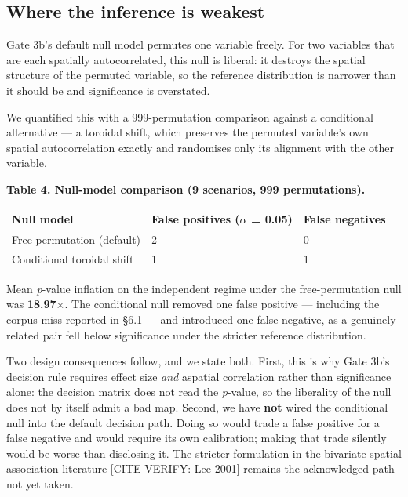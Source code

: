 \subsection{Where the inference is weakest}
Gate 3b's default null model permutes one variable freely. For two variables that are each spatially autocorrelated, this null is liberal: it destroys the spatial structure of the permuted variable, so the reference distribution is narrower than it should be and significance is overstated.

We quantified this with a 999-permutation comparison against a conditional alternative --- a toroidal shift, which preserves the permuted variable's own spatial autocorrelation exactly and randomises only its alignment with the other variable.

\textbf{Table 4. Null-model comparison (9 scenarios, 999 permutations).}

\begin{table}[htbp]
\centering
\small
\begin{tabular}{p{}p{}p{}}
\toprule
Null model & False positives ($\alpha$ = 0.05) & False negatives \\
\midrule
Free permutation (default) & 2 & 0 \\
Conditional toroidal shift & 1 & 1 \\
\bottomrule
\end{tabular}
\end{table}
Mean \emph{p}-value inflation on the independent regime under the free-permutation null was \textbf{18.97$\times$}. The conditional null removed one false positive --- including the corpus miss reported in \S{}6.1 --- and introduced one false negative, as a genuinely related pair fell below significance under the stricter reference distribution.

Two design consequences follow, and we state both. First, this is why Gate 3b's decision rule requires effect size \emph{and} aspatial correlation rather than significance alone: the decision matrix does not read the \emph{p}-value, so the liberality of the null does not by itself admit a bad map. Second, we have \textbf{not} wired the conditional null into the default decision path. Doing so would trade a false positive for a false negative and would require its own calibration; making that trade silently would be worse than disclosing it. The stricter formulation in the bivariate spatial association literature [CITE-VERIFY: Lee 2001] remains the acknowledged path not yet taken.

